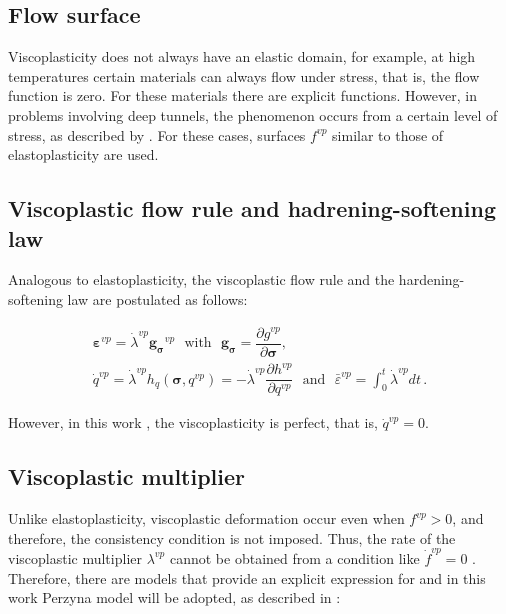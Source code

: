 \documentclass[Journal,letterpaper]{ascelike-new}
\newcommand{\hl}{{h_q}}
\newcommand{\strainvp}{\boldsymbol{\varepsilon}^{vp}}
\newcommand{\strainvpeq}{\bar \varepsilon^{vp}}
\newcommand{\dgds}{\boldsymbol{g_\sigma}}
\newcommand{\stress}{\boldsymbol{\sigma}}
\begin{document}
\subsection{Flow surface}

Viscoplasticity does not always have an elastic domain, for example, at high temperatures certain materials can always flow under stress, that is, the flow function is zero. For these materials there are explicit functions. However, in problems involving deep tunnels, the phenomenon occurs from a certain level of stress, as described by . For these cases, surfaces $f^{vp}$ similar to those of elastoplasticity are used.

\subsection{Viscoplastic flow rule and hadrening-softening law}

Analogous to elastoplasticity, the viscoplastic flow rule and the hardening-softening law are postulated as follows:

\begin{equation} \label{eq_plastic_flow_rule}
	\begin{array}{lcl}
		\strainvp = \dot \lambda^{vp} \dgds^{vp} ~~~ \text{with} ~~~ \dgds = \dfrac{\partial g^{vp}}{\partial \stress}, \\ 
		\dot q^{vp} = \dot \lambda^{vp} \hl(\stress,q^{vp}) = - \dot \lambda^{vp} \dfrac{\partial h^{vp}}{\partial q^{vp}} ~~~\text{and} ~~~ \strainvpeq = \int_{0}^{t} \dot \lambda^{vp} dt  \,.
	\end{array}
\end{equation}

However, in this work , the viscoplasticity is perfect, that is, $\dot q^{vp} = 0$.

\subsection{Viscoplastic multiplier}

Unlike elastoplasticity, viscoplastic deformation occur even when $f^{vp} > 0$, and therefore, the consistency condition is not imposed. Thus, the rate of the viscoplastic multiplier $\lambda^{vp}$ cannot be obtained from a condition like $\dot f^{vp} = 0$ . Therefore, there are models that provide an explicit expression for  and in this work Perzyna model \cite{perzyna1966} will be adopted, as described in :
\end{document}
